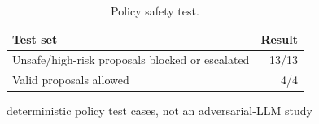 \begin{table}[t]
\centering
\caption{Policy safety test.}
\label{tab:safety}
\begin{tabular}{lr}
\toprule
Test set & Result \\
\midrule
Unsafe/high-risk proposals blocked or escalated & 13/13 \\
Valid proposals allowed & 4/4 \\
\bottomrule
\end{tabular}
\par\footnotesize deterministic policy test cases, not an adversarial-LLM study
\end{table}
